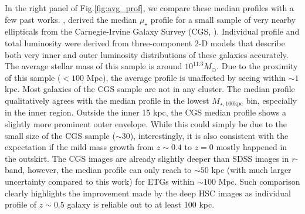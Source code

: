 \documentclass{emulateapj}
\def\rbcg{\texttt{cenHighMh}}
\def\nbcg{\texttt{cenLowMh}}
\def\mtot{{$M_{\star,100\mathrm{kpc}}$}}
\def\mden{{$\mu_{\star}$}}
\begin{document}
\begin{CJK*}{UTF8}{gbsn}
    
    In the right panel of Fig.\ref{fig:avg_prof}, we compare these median profiles with 
    a few past works.  
    \citep{Huang2013a}, derived the median \mden{} profile for a small sample of very nearby 
    ellipticals from the Carnegie-Irvine Galaxy Survey (CGS, \citealt{CGS1}).
    Individual profile and total luminosity were derived from three-component 2-D models 
    that describe both very inner and outer luminosity distributions of these galaxies 
    accurately. 
    The average stellar mass of this sample is around $10^{11.3} M_{\odot}$.
    Due to the proximity of this sample ($< 100$ Mpc), the average profile is unaffected by 
    seeing within $\sim 1$ kpc.
    Most galaxies of the CGS sample are not in any cluster.
    The median profile qualitatively agrees with the median profile in the lowest 
    \mtot{} bin, especially in the inner region. 
    Outside the inner 15 kpc, the CGS median profile shows a slightly more prominent 
    outer envelope.  
    While this could simply be due to the small size of the CGS sample ($\sim 30$),
    interestingly, it is also consistent with the expectation if the mild mass growth 
    from $z\sim 0.4$ to $z=0$ mostly happened in the outskirt.   
    The CGS images are already slightly deeper than SDSS images in $r$-band,
    however, the median profile can only reach to $\sim 50$ kpc (with much larger 
    uncertainty compared to this work) for ETGs within $\sim 100$ Mpc.
    Such comparison clearly highlights the improvement made by the deep HSC images as 
    individual profile of $z\sim 0.5$ galaxy is reliable out to at least 100 kpc.  
    

\end{CJK*}
\end{document}
